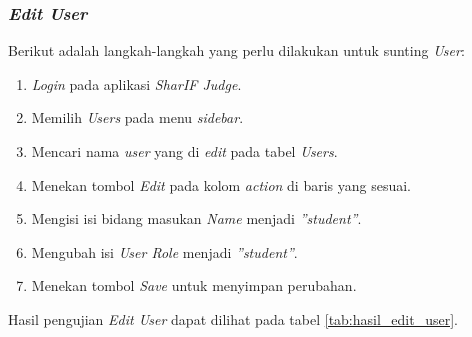 \subsubsection{\textit{Edit User}}
\label{subsubsec:skenario_edit_user}
Berikut adalah langkah-langkah yang perlu dilakukan untuk sunting \textit{User}:

\begin{enumerate}
	\item \textit{Login} pada aplikasi \textit{SharIF Judge}.
	\item Memilih \textit{Users} pada menu \textit{sidebar}.
	\item Mencari nama \textit{user} yang di \textit{edit} pada tabel \textit{Users}.
	\item Menekan tombol \textit{Edit} pada kolom \textit{action} di baris yang sesuai.
	\item Mengisi isi bidang masukan \textit{Name} menjadi \textit{''student''}.
	\item Mengubah isi \textit{User Role} menjadi \textit{''student''}. 
	\item Menekan tombol \textit{Save} untuk menyimpan perubahan.
\end{enumerate}	

Hasil pengujian \textit{Edit User} dapat dilihat pada tabel \ref{tab:hasil_edit_user}.

